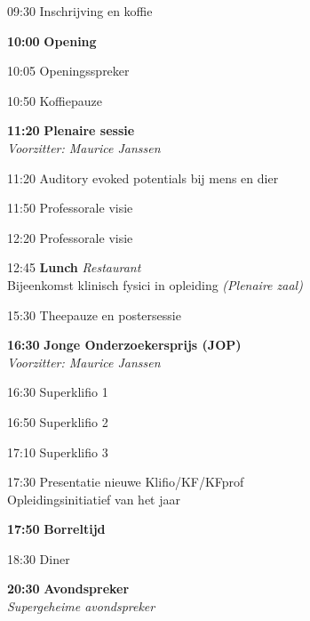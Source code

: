 \documentclass[a4paper,10pt]{report}
\begin{document}
\begin{multicols*}{3}
\begin{packed_enum}
    \item[09:30] Inschrijving en koffie
        \vfill
    \item[\textbf{10:00}] \textbf{Opening}
        \vfill
    \item[10:05] Openingsspreker
        \vfill
    \item[10:50] Koffiepauze
        \vfill
    \item[\textbf{11:20}] {\textbf{Plenaire sessie}}\\\textit{Voorzitter: Maurice Janssen}
        \item[11:20] Auditory evoked potentials bij mens en dier
        \item[11:50] Professorale visie
        \item[12:20] Professorale visie
        \vfill
    \item[12:45] \textbf{Lunch} \hfill{\small \textit{Restaurant}}\\
        {\small Bijeenkomst klinisch fysici in opleiding \hfill\textit{(Plenaire zaal)}}
        \vfill
    \item[{\color{DarkBlue}{\textbf{14:00}}}]{ }
        \vfill
    \item[15:30] Theepauze en postersessie 
        \vfill
    \item[\textbf{16:30}] {\textbf{Jonge Onderzoekersprijs (JOP)}}\\\textit{Voorzitter: Maurice Janssen}
    \item[16:30] Superklifio 1
    \item[16:50] Superklifio 2
    \item[17:10] Superklifio 3
        \vfill
    \item[17:30] Presentatie nieuwe Klifio/KF/KFprof\\Opleidingsinitiatief van het jaar
        \vfill
    \item[\textbf{17:50}] {\textbf{Borreltijd}}
        \vfill
    \item[18:30] Diner
        \vfill
    \item[\textbf{20:30}] {\textbf{Avondspreker}}\\{\textit{Supergeheime avondspreker}}
    \end{packed_enum}%


\end{multicols*}
\end{document}
